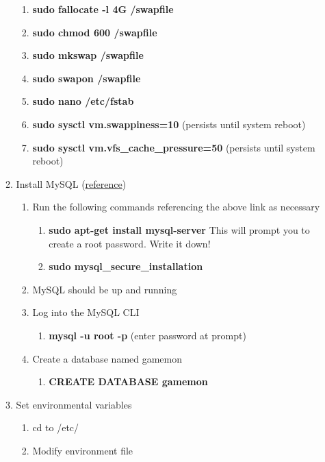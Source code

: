 \documentclass{article}
\begin{document}
\begin{flushleft}
\begin{enumerate}
\begin{enumerate}
    \begin{enumerate}
      \item \textbf{sudo fallocate -l 4G /swapfile}
      \item \textbf{sudo chmod 600 /swapfile}
      \item \textbf{sudo mkswap /swapfile}
      \item \textbf{sudo swapon /swapfile}
      \item \textbf{sudo nano /etc/fstab}
      \item \textbf{sudo sysctl vm.swappiness=10} (persists until system reboot)
      \item \textbf{sudo sysctl vm.vfs\_cache\_pressure=50} (persists until system reboot)
    \end{enumerate}
    \item Install MySQL (\href{https://www.digitalocean.com/community/tutorials/how-to-install-mysql-on-ubuntu-16-04}{reference})
    \begin{enumerate}
      \item Run the following commands referencing the above link as necessary
      \begin{enumerate}
        \item \textbf{sudo apt-get install mysql-server} This will prompt you to create a root password. Write it down!
        \item \textbf{sudo mysql\_secure\_installation}
      \end{enumerate}
      \item MySQL should be up and running
      \item Log into the MySQL CLI
      \begin{enumerate}
        \item \textbf{mysql -u root -p} (enter password at prompt)
      \end{enumerate}
      \item Create a database named gamemon
      \begin{enumerate}
        \item \textbf{CREATE DATABASE gamemon}
      \end{enumerate}
    \end{enumerate}
    \item Set environmental variables
    \begin{enumerate}
      \item cd to /etc/
      \item Modify environment file
      \begin{enumerate}

\end{enumerate}
\end{enumerate}
\end{enumerate}
\end{enumerate}
\end{flushleft}
\end{document}
